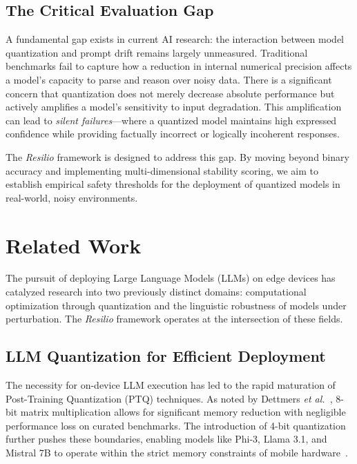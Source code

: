 \documentclass[conference]{IEEEtran}
\begin{document}
\subsection{The Critical Evaluation Gap}

A fundamental gap exists in current AI research: the interaction between model quantization and prompt drift remains largely unmeasured. Traditional benchmarks fail to capture how a reduction in internal numerical precision affects a model's capacity to parse and reason over noisy data. There is a significant concern that quantization does not merely decrease absolute performance but actively amplifies a model’s sensitivity to input degradation. This amplification can lead to \textit{silent failures}—where a quantized model maintains high expressed confidence while providing factually incorrect or logically incoherent responses.

The \textit{Resilio} framework is designed to address this gap. By moving beyond binary accuracy and implementing multi-dimensional stability scoring, we aim to establish empirical safety thresholds for the deployment of quantized models in real-world, noisy environments.

\section{Related Work}

The pursuit of deploying Large Language Models (LLMs) on edge devices has catalyzed research into two previously distinct domains: computational optimization through quantization and the linguistic robustness of models under perturbation. The \textit{Resilio} framework operates at the intersection of these fields.

\subsection{LLM Quantization for Efficient Deployment}

The necessity for on-device LLM execution has led to the rapid maturation of Post-Training Quantization (PTQ) techniques. As noted by Dettmers \textit{et al.}~\cite{ref1}, 8-bit matrix multiplication allows for significant memory reduction with negligible performance loss on curated benchmarks. The introduction of 4-bit quantization further pushes these boundaries, enabling models like Phi-3, Llama 3.1, and Mistral 7B to operate within the strict memory constraints of mobile hardware~\cite{ref2, ref3, ref9}. 
\end{document}
